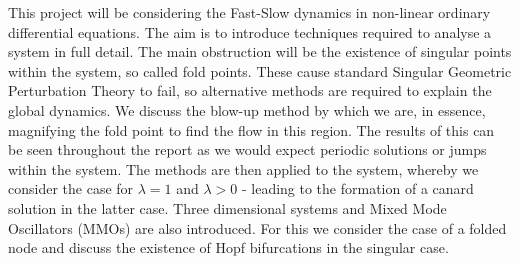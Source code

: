 This project will be considering the Fast-Slow dynamics in non-linear ordinary differential equations. The aim is to introduce techniques required to analyse a system in full detail. The main obstruction will be the existence of singular points within the system, so called fold points. These cause standard Singular Geometric Perturbation Theory to fail, so alternative methods are required to explain the global dynamics. We discuss the blow-up method by which we are, in essence, magnifying the fold point to find the flow in this region. The results of this can be seen throughout the report as we would expect periodic solutions or jumps within the system. The methods are then applied to the \vdp system, whereby we consider the case for $ \lambda=1 $ and $ \lambda>0 $ - leading to the formation of a canard solution in the latter case. Three dimensional systems and Mixed Mode Oscillators (MMOs) are also introduced. For this we consider the case of a folded node and discuss the existence of Hopf bifurcations in the singular case.  
